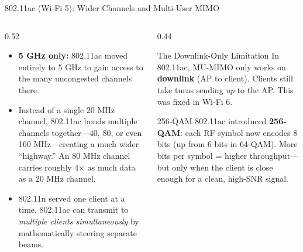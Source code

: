\documentclass[aspectratio=169]{beamer}
\begin{document}
\begin{frame}{802.11ac (Wi-Fi 5): Wider Channels and Multi-User MIMO}
    \begin{columns}[T]
        \begin{column}{0.52\textwidth}
            \footnotesize
            \begin{itemize}
                \item \textbf{5 GHz only:} 802.11ac moved entirely to 5 GHz to gain access to the many uncongested channels there.
                \item {} Instead of a single 20 MHz channel, 802.11ac bonds multiple channels together---40, 80, or even 160 MHz---creating a much wider ``highway.'' An 80 MHz channel carries roughly 4$\times$ as much data as a 20 MHz channel.
                \item {} 802.11n served one client at a time. 802.11ac can transmit to \emph{multiple clients simultaneously} by mathematically steering separate beams.
            \end{itemize}
        \end{column}
        \begin{column}{0.44\textwidth}
            \begin{alertblock}{The Downlink-Only Limitation}
                \footnotesize
                In 802.11ac, MU-MIMO only works on \textbf{downlink} (AP to client). Clients still take turns sending \emph{up} to the AP. This was fixed in Wi-Fi 6.
            \end{alertblock}
            \vspace{0.3em}
            \begin{block}{256-QAM}
                \footnotesize
                802.11ac introduced \textbf{256-QAM}: each RF symbol now encodes 8 bits (up from 6 bits in 64-QAM). More bits per symbol = higher throughput---but only when the client is close enough for a clean, high-SNR signal.
            \end{block}
        \end{column}
    \end{columns}
\end{frame}
\end{document}
